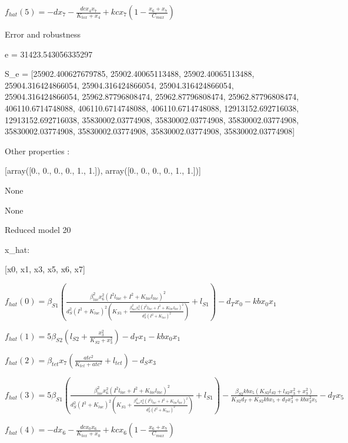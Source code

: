 $f_{hat}(5)=- d x_{7} - \frac{dc x_{4} x_{7}}{K_{tox} + x_{4}} + kc x_{7} \left(1 - \frac{x_{6} + x_{7}}{C_{max}}\right)$



Error and robustness 


e = 31423.543056335297

S_e = [25902.400627679785, 25902.40065113488, 25902.40065113488, 25904.316424866054, 25904.316424866054, 25904.316424866054, 25904.316424866054, 25962.87796808474, 25962.87796808474, 25962.87796808474, 406110.6714748088, 406110.6714748088, 406110.6714748088, 12913152.692716038, 12913152.692716038, 35830002.03774908, 35830002.03774908, 35830002.03774908, 35830002.03774908, 35830002.03774908, 35830002.03774908, 35830002.03774908]

Other properties :


[array([0., 0., 0., 0., 1., 1.]), array([0., 0., 0., 0., 1., 1.])]

None

None

Reduced model 20

x_{hat}: 

[x0, x1, x3, x5, x6, x7]


$f_{hat}(0)=\beta_{S1} \left(\frac{\beta_{lac}^{2} x_{6}^{2} \left(I^{2} l_{lac} + I^{2} + K_{lac} l_{lac}\right)^{2}}{d_{S}^{2} \left(I^{2} + K_{lac}\right)^{2} \left(K_{S1} + \frac{\beta_{lac}^{2} x_{6}^{2} \left(I^{2} l_{lac} + I^{2} + K_{lac} l_{lac}\right)^{2}}{d_{S}^{2} \left(I^{2} + K_{lac}\right)^{2}}\right)} + l_{S1}\right) - d_{T} x_{0} - kb x_{0} x_{1}$


$f_{hat}(1)=5 \beta_{S2} \left(l_{S2} + \frac{x_{3}^{2}}{K_{S2} + x_{3}^{2}}\right) - d_{T} x_{1} - kb x_{0} x_{1}$


$f_{hat}(2)=\beta_{tet} x_{7} \left(\frac{atc^{2}}{K_{tet} + atc^{2}} + l_{tet}\right) - d_{S} x_{3}$


$f_{hat}(3)=5 \beta_{S1} \left(\frac{\beta_{lac}^{2} x_{6}^{2} \left(I^{2} l_{lac} + I^{2} + K_{lac} l_{lac}\right)^{2}}{d_{S}^{2} \left(I^{2} + K_{lac}\right)^{2} \left(K_{S1} + \frac{\beta_{lac}^{2} x_{6}^{2} \left(I^{2} l_{lac} + I^{2} + K_{lac} l_{lac}\right)^{2}}{d_{S}^{2} \left(I^{2} + K_{lac}\right)^{2}}\right)} + l_{S1}\right) - \frac{\beta_{S2} kb x_{5} \left(K_{S2} l_{S2} + l_{S2} x_{3}^{2} + x_{3}^{2}\right)}{K_{S2} d_{T} + K_{S2} kb x_{5} + d_{T} x_{3}^{2} + kb x_{3}^{2} x_{5}} - d_{T} x_{5}$


$f_{hat}(4)=- d x_{6} - \frac{dc x_{0} x_{6}}{K_{tox} + x_{0}} + kc x_{6} \left(1 - \frac{x_{6} + x_{7}}{C_{max}}\right)$


